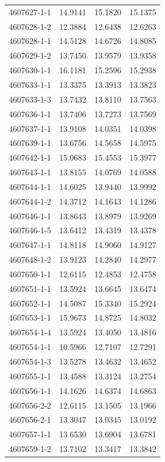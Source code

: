 \begin{longtable}{lrrr}
4607627-1-1 & 14.9141 & 15.1820 & 15.1375 \\
4607628-1-2 & 12.3884 & 12.6438 & 12.6263 \\
4607628-1-1 & 14.5128 & 14.6726 & 14.8085 \\
4607629-1-2 & 13.7450 & 13.9579 & 13.9358 \\
4607630-1-1 & 16.1181 & 15.2596 & 15.2938 \\
4607633-1-1 & 13.3375 & 13.3913 & 13.3823 \\
4607633-1-3 & 13.7432 & 13.8110 & 13.7563 \\
4607636-1-1 & 13.7406 & 13.7273 & 13.7569 \\
4607637-1-1 & 13.9108 & 14.0351 & 14.0398 \\
4607639-1-1 & 13.6756 & 14.5658 & 14.5975 \\
4607642-1-1 & 15.0683 & 15.4553 & 15.3977 \\
4607643-1-1 & 13.8155 & 14.0769 & 14.0588 \\
4607644-1-1 & 14.6025 & 13.9440 & 13.9992 \\
4607644-1-2 & 14.3712 & 14.1643 & 14.1286 \\
4607646-1-1 & 13.8643 & 13.8979 & 13.9269 \\
4607646-1-5 & 13.6412 & 13.4319 & 13.4378 \\
4607647-1-1 & 14.8118 & 14.9060 & 14.9127 \\
4607648-1-2 & 13.9123 & 14.2840 & 14.2977 \\
4607650-1-1 & 12.6115 & 12.4853 & 12.4758 \\
4607651-1-1 & 13.5924 & 13.6645 & 13.6474 \\
4607652-1-1 & 14.5087 & 15.3340 & 15.2924 \\
4607653-1-1 & 15.9673 & 14.8725 & 14.8032 \\
4607654-1-4 & 13.5924 & 13.4050 & 13.4816 \\
4607654-1-1 & 10.5966 & 12.7107 & 12.7291 \\
4607654-1-3 & 13.5278 & 13.4632 & 13.4652 \\
4607655-1-1 & 13.4588 & 13.3124 & 13.2754 \\
4607656-1-1 & 14.1626 & 14.6374 & 14.6863 \\
4607656-2-2 & 12.6115 & 13.1505 & 13.1966 \\
4607656-2-1 & 13.3047 & 13.0345 & 13.0192 \\
4607657-1-1 & 13.6530 & 13.6904 & 13.6781 \\
4607659-1-2 & 13.7102 & 13.3417 & 13.3842 \\

\end{longtable}
